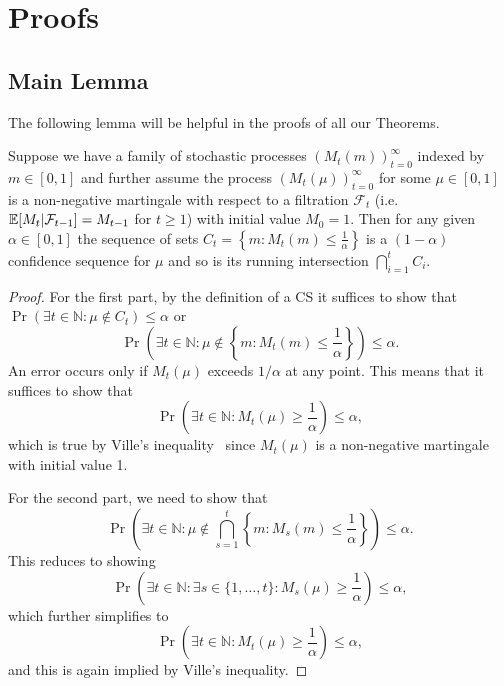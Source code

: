 \section{Proofs}

\subsection{Main Lemma}
The following lemma will be helpful in the proofs of all our Theorems.
\begin{lemma}
\label{lem:main}
Suppose we have a family of stochastic processes 
$(M_t(m))_{t=0}^{\infty}$ indexed by $m \in [0,1]$ and further assume
the process $(M_t(\mu))_{t=0}^{\infty}$ for some $\mu \in [0,1]$ is a 
non-negative martingale with respect to a filtration $\mathcal{F}_t$ 
(i.e.\ $\mathbb{E}[M_t|\mathcal{F}_{t-1}]=M_{t-1}$ for $t \geq 1$)
with initial value $M_0=1$. Then for any given
$\alpha \in [0,1]$ the sequence of sets
$C_t = \left\{m: M_t(m) \leq \frac{1}{\alpha}\right\}$ is a 
$(1-\alpha)$ confidence sequence for $\mu$ and so is
its running intersection $\bigcap_{i=1}^t C_i$.
\end{lemma}
\begin{proof}
For the first part, by the definition of a CS it suffices to show that
$\Pr\left(\exists t \in \mathbb{N}: \mu \notin C_t\right) \leq \alpha$ or
\[
\Pr\left(\exists t \in \mathbb{N}: \mu \notin \left\{m: M_t(m) \leq \frac{1}{\alpha}\right\}\right) \leq \alpha.
\]
An error occurs only if $M_t(\mu)$ exceeds $1/\alpha$ at any point. This means that it suffices to show that
\[
\Pr\left(\exists t \in \mathbb{N}: M_t(\mu) \geq \frac{1}{\alpha}\right) \leq \alpha ,
\]
which is true by Ville's inequality~\cite{ville1939etude} since $M_t(\mu)$ is a 
non-negative martingale with initial value 1.

For the second part, we need to show that
\[
\Pr\left(\exists t \in \mathbb{N}: \mu \notin \bigcap_{s=1}^t\left\{m: M_s(m) \leq \frac{1}{\alpha}\right\}\right) \leq \alpha.
\]
This reduces to showing
\[
\Pr\left(\exists t \in \mathbb{N}: \exists s\in \{1,\ldots,t\}: M_s(\mu) \geq \frac{1}{\alpha}\right) \leq \alpha,
\]
which further simplifies to
\[
\Pr\left(\exists t \in \mathbb{N}: M_t(\mu) \geq \frac{1}{\alpha}\right) \leq \alpha,
\]
and this is again implied by Ville's inequality.
\end{proof}

